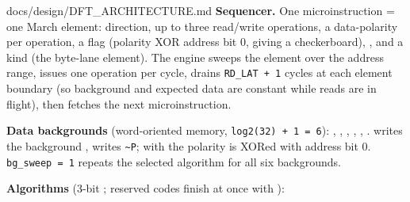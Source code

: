 \begin{relocated}{docs/design/DFT_ARCHITECTURE.md}
\textbf{Sequencer.} One microinstruction = one March element: direction,
up to three read/\allowbreak{}write operations, a data-polarity per
operation, a  flag (polarity XOR address bit 0, giving a
checkerboard), , and a  kind (the
byte-lane element). The engine sweeps the element over the address
range, issues one operation per cycle, drains
\texttt{RD\_\allowbreak{}LAT\ +\allowbreak{}\ 1} cycles at each element
boundary (so background and expected data are constant while reads are
in flight), then fetches the next microinstruction.

\textbf{Data backgrounds} (word-oriented memory,
\texttt{log2(32)\ +\allowbreak{}\ 1\ =\allowbreak{}\ 6}):
, , ,
, , . 
writes the background ,  writes
\texttt{\textasciitilde{}P}; with  the polarity is XORed with
address bit 0. \texttt{bg\_\allowbreak{}sweep\ =\allowbreak{}\ 1}
repeats the selected algorithm for all six backgrounds.

\textbf{Algorithms} (3-bit ; reserved codes finish at once
with ):

{\footnotesize\setlength{\tabcolsep}{3pt}

}
\end{relocated}
